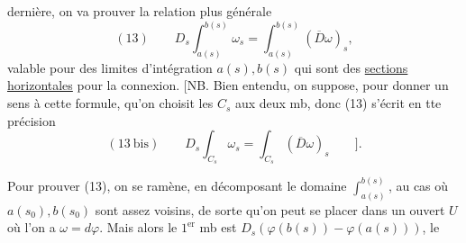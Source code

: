 dernière, on  va prouver la relation plus générale
\[
(13)\qquad D_s\int_{a(s)}^{b(s)}\omega_s=\int_{a(s)}^{b(s)}(\overline D\omega)_s,
\]
valable pour des limites d'intégration $a(s),b(s)$ qui sont des \uline{sections horizontales} pour la connexion. [NB. Bien entendu, on suppose, pour donner un sens à cette formule, qu'on choisit les  $C_s$ aux deux mb, donc (13) s'écrit en tte précision
\[
(13\ \mathrm{bis})\qquad D_s\int_{C_s}\omega_s=\int_{C_s}(\overline D\omega)_s\qquad].
\]

Pour prouver (13), on se ramène, en  décomposant le domaine $\int_{a(s)}^{b(s)}$, au cas où $a(s_0),b(s_0)$ sont assez voisins, de sorte qu'on peut se placer dans un ouvert $U$ où l'on a $\omega=d\varphi$. Mais alors le $1^{\mathrm{er}}$ mb est $D_s(\varphi(b(s))-\varphi(a(s)))$, le
